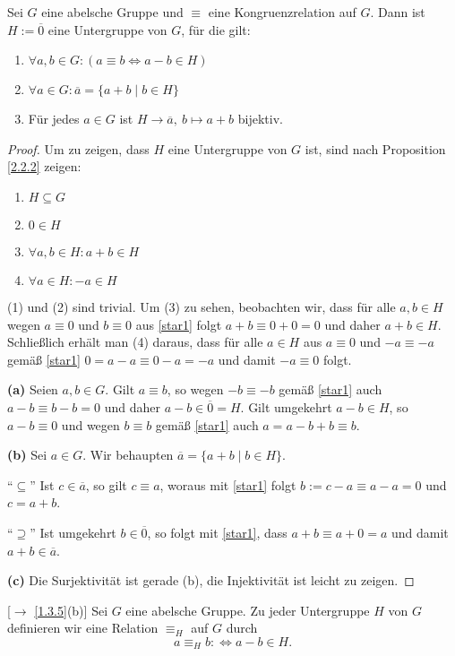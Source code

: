 \documentclass[../../main.tex]{subfiles}
\begin{document}
\begin{pro}\label{2.3.4}
Sei $G$ eine abelsche Gruppe und $\equiv$ eine Kongruenzrelation auf $G$. Dann ist $H:=\overline0$ eine Untergruppe von $G$, für die gilt:
\begin{enumerate}[\rm(a)]
\item $\forall a,b\in G:(a\equiv b\iff a-b\in H)$
\item $\forall a\in G:\overline a=\{a+b\mid b\in H\}$ \label{hpropb}
\item Für jedes $a\in G$ ist $H\to\overline a,\ b\mapsto a+b$ bijektiv. \label{hpropc}
\end{enumerate}
\end{pro}
\begin{proof}
Um zu zeigen, dass $H$ eine Untergruppe von $G$ ist, sind nach Proposition \ref{2.2.2} zeigen:
\begin{enumerate}[(1)]
\item $H\subseteq G$
\item $0\in H$
\item $\forall a,b\in H:a+b\in H$
\item $\forall a\in H:-a\in H$
\end{enumerate}
(1) und (2) sind trivial. Um (3) zu sehen, beobachten wir, dass für alle $a,b\in H$ wegen $a\equiv0$ und $b\equiv0$ aus \eqref{star1} folgt
$a+b\equiv0+0=0$ und daher $a+b\in H$.  Schließlich erhält man (4) daraus, dass für alle $a\in H$ aus $a\equiv0$ und $-a\equiv-a$ gemäß \eqref{star1}
$0=a-a\equiv0-a=-a$ und damit $-a\equiv0$ folgt.

\smallskip
{\bf (a)} Seien $a,b\in G$. Gilt $a\equiv b$, so wegen $-b\equiv-b$ gemäß \eqref{star1} auch $a-b\equiv b-b=0$ und daher $a-b\in\overline0=H$. Gilt umgekehrt $a-b\in H$, so
$a-b\equiv0$ und wegen $b\equiv b$ gemäß \eqref{star1} auch $a=a-b+b\equiv b$.

\smallskip
{\bf (b)} Sei $a\in G$. Wir behaupten $\overline a=\{a+b\mid b\in H\}$.

"`$\subseteq$"' Ist $c\in\overline a$, so gilt $c\equiv a$, woraus mit \eqref{star1} folgt $b:=c-a\equiv a-a=0$ und $c=a+b$.

"`$\supseteq$"' Ist umgekehrt $b\in\overline0$, so folgt mit \eqref{star1}, dass $a+b\equiv a+0=a$ und damit $a+b\in\overline a$.

\smallskip
{\bf (c)} Die Surjektivität ist gerade (b), die Injektivität ist leicht zu zeigen.
\end{proof}

\begin{df}\mbox{}[$\to$ \ref{1.3.5}(b)]\label{2.3.5}
Sei $G$ eine abelsche Gruppe. Zu jeder Untergruppe $H$ von $G$ definieren wir eine Relation $\equiv_H$ auf $G$ durch
$$a\equiv_H b:\iff a-b\in H.$$
\end{df}
\end{document}
